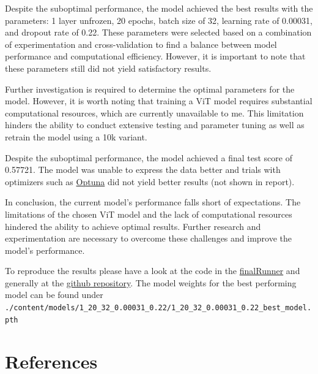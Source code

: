 \documentclass{article}
\begin{document}
Despite the suboptimal performance, the model achieved the best results with the parameters: 1 layer unfrozen, 20 epochs, batch size of 32, learning rate of 0.00031, and dropout rate of 0.22. These parameters were selected based on a combination of experimentation and cross-validation to find a balance between model performance and computational efficiency. However, it is important to note that these parameters still did not yield satisfactory results.

Further investigation is required to determine the optimal parameters for the model. However, it is worth noting that training a ViT model requires substantial computational resources, which are currently unavailable to me. This limitation hinders the ability to conduct extensive testing and parameter tuning as well as retrain the model using a 10k variant. 

Despite the suboptimal performance, the model achieved a final test score of 0.57721. The model was unable to express the data better and trials with optimizers such as \href{https://optuna.org/}{Optuna} did not yield better results (not shown in report).

In conclusion, the current model's performance falls short of expectations. The limitations of the chosen ViT model and the lack of computational resources hindered the ability to achieve optimal results. Further research and experimentation are necessary to overcome these challenges and improve the model's performance. 

To reproduce the results please have a look at the code in the \href{https://github.com/Riemer1818/AI6126-AdCV-Proj1/blob/main/code/finalRunner.ipynb}{finalRunner} and generally at the \href{https://github.com/Riemer1818/AI6126-AdCV-Proj1/}{github repository}. The model weights for the best performing model can be found under \texttt{./content/models/1\_20\_32\_0.00031\_0.22/1\_20\_32\_0.00031\_0.22\_best\_model.pth}


\newpage

\section{References}



\end{document}
